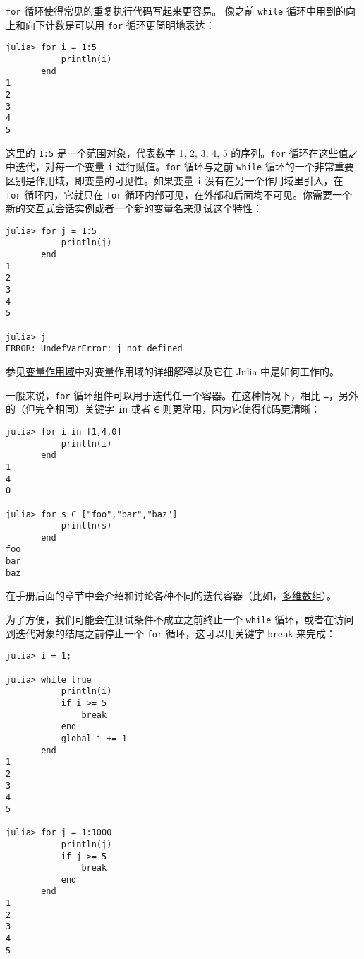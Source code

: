 \texttt{for} 循环使得常见的重复执行代码写起来更容易。 像之前 \texttt{while} 循环中用到的向上和向下计数是可以用 \texttt{for} 循环更简明地表达：




\begin{verbatim}
julia> for i = 1:5
           println(i)
       end
1
2
3
4
5
\end{verbatim}



这里的 \texttt{1:5} 是一个范围对象，代表数字 1, 2, 3, 4, 5 的序列。\texttt{for} 循环在这些值之中迭代，对每一个变量 \texttt{i} 进行赋值。\texttt{for} 循环与之前 \texttt{while} 循环的一个非常重要区别是作用域，即变量的可见性。如果变量 \texttt{i} 没有在另一个作用域里引入，在 \texttt{for} 循环内，它就只在 \texttt{for} 循环内部可见，在外部和后面均不可见。你需要一个新的交互式会话实例或者一个新的变量名来测试这个特性：




\begin{verbatim}
julia> for j = 1:5
           println(j)
       end
1
2
3
4
5

julia> j
ERROR: UndefVarError: j not defined
\end{verbatim}



参见\hyperlink{11957539949537805757}{变量作用域}中对变量作用域的详细解释以及它在 Julia 中是如何工作的。



一般来说，\texttt{for} 循环组件可以用于迭代任一个容器。在这种情况下，相比 \texttt{=}，另外的（但完全相同）关键字 \texttt{in} 或者 \texttt{∈} 则更常用，因为它使得代码更清晰：




\begin{verbatim}
julia> for i in [1,4,0]
           println(i)
       end
1
4
0

julia> for s ∈ ["foo","bar","baz"]
           println(s)
       end
foo
bar
baz
\end{verbatim}



在手册后面的章节中会介绍和讨论各种不同的迭代容器（比如，\hyperlink{16720099245556932994}{多维数组}）。



为了方便，我们可能会在测试条件不成立之前终止一个 \texttt{while} 循环，或者在访问到迭代对象的结尾之前停止一个 \texttt{for} 循环，这可以用关键字 \texttt{break} 来完成：




\begin{verbatim}
julia> i = 1;

julia> while true
           println(i)
           if i >= 5
               break
           end
           global i += 1
       end
1
2
3
4
5

julia> for j = 1:1000
           println(j)
           if j >= 5
               break
           end
       end
1
2
3
4
5
\end{verbatim}



